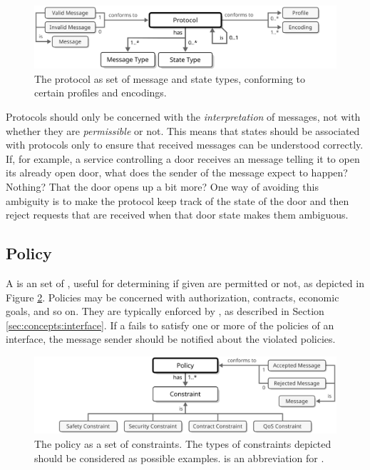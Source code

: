 \vfill

\begin{figure}[ht!]
  \centering
  \includegraphics[scale=0.9]{figures/protocol}
  \caption{
    The protocol as set of message and state types, conforming to certain profiles and encodings.
  }
  \label{fig:protocol}
\end{figure}

\vfill

Protocols should only be concerned with the \textit{interpretation} of messages, not with whether they are \textit{permissible} or not.
This means that states should be associated with protocols only to ensure that received messages can be understood correctly.
If, for example, a service controlling a door receives an message telling it to open its already open door, what does the sender of the message expect to happen?
Nothing?
That the door opens up a bit more?
One way of avoiding this ambiguity is to make the protocol keep track of the state of the door and then reject requests that are received when that door state makes them ambiguous.

\subsection{Policy}
\label{sec:concepts:policy}

A  is an  set of , useful for determining if given  are permitted or not, as depicted in Figure \ref{fig:policy}.
Policies may be concerned with authorization, contracts, economic goals, and so on.
They are typically enforced by , as described in Section \ref{sec:concepts:interface}.
If a  fails to satisfy one or more of the policies of an interface, the message sender should be notified about the violated policies.

\vfill

\begin{figure}[ht!]
  \centering
  \includegraphics[scale=0.9]{figures/policy}
  \caption{
    The policy as a set of constraints.
    The types of constraints depicted should be considered as possible examples.
     is an abbreviation for .
  }
  \label{fig:policy}
\end{figure}

